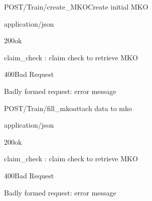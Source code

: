 \documentclass[12pt, etter]{article}
\begin{document}
\begin{apiRoute}{POST}{/Train/create\_MKO}{Create initial MKO}
    \begin{routeParameter}
    \end{routeParameter}
    \begin{routeResponse}{application/json}
        \begin{routeResponseItem}{200}{ok}
            \begin{routeResponseItemBody}
                claim_check : claim check to retrieve MKO
            \end{routeResponseItemBody}
        \end{routeResponseItem}
        \begin{routeResponseItem}{400}{Bad Request}
            \begin{routeResponseItemBody}
                Badly formed request: {error message}
            \end{routeResponseItemBody}
        \end{routeResponseItem}
    \end{routeResponse}
\end{apiRoute}

\begin{apiRoute}{POST}{/Train/fill\_mko}{attach data to mko}
    \begin{routeParameter}
    \end{routeParameter}
    \begin{routeResponse}{application/json}
        \begin{routeResponseItem}{200}{ok}
            \begin{routeResponseItemBody}
                claim_check : claim check to retrieve MKO
            \end{routeResponseItemBody}
        \end{routeResponseItem}
        \begin{routeResponseItem}{400}{Bad Request}
            \begin{routeResponseItemBody}
                Badly formed request: {error message}
            \end{routeResponseItemBody}
        \end{routeResponseItem}
    \end{routeResponse}
\end{apiRoute}
\end{document}
